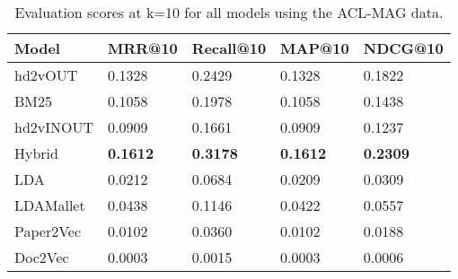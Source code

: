 \begin{table}[]
\centering
    \caption{Evaluation scores at k=10 for all models using the ACL-MAG data.}
    \label{tab:mag50evalk10}
\begin{center}
    \begin{tabular}{lllll}
    \toprule
    Model & MRR@10 & Recall@10 & MAP@10 & NDCG@10 \\
    \midrule
    hd2vOUT  & 0.1328 & 0.2429 & 0.1328 & 0.1822 \\
    BM25       & 0.1058 & 0.1978 & 0.1058 & 0.1438 \\
    hd2vINOUT & 0.0909 & 0.1661 & 0.0909 & 0.1237 \\
    Hybrid  & \textbf{0.1612} & \textbf{0.3178} & \textbf{0.1612} & \textbf{0.2309} \\
    LDA     & 0.0212 & 0.0684 & 0.0209 & 0.0309 \\
    LDAMallet       & 0.0438 & 0.1146 & 0.0422 & 0.0557 \\
    Paper2Vec        & 0.0102 & 0.0360 & 0.0102 & 0.0188 \\
    Doc2Vec       & 0.0003 & 0.0015 & 0.0003 & 0.0006 \\
    \bottomrule
    \end{tabular}
\end{center}
\end{table}
